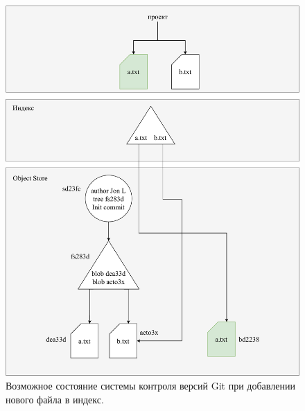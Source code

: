 \begin{figure}[hbtp]
	\centering
	\includegraphics[width=\textwidth]{./img/git-add.pdf}
	\caption{Возможное состояние системы контроля версий Git при добавлении нового файла в индекс.}
	\label{fig:git2}
\end{figure}

